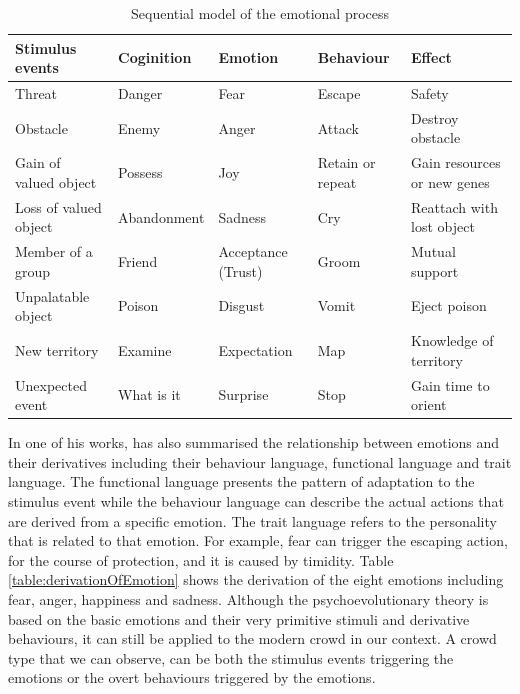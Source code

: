 \begin{table}
\caption{Sequential model of the emotional process}
\label{table:sequentialModelOfEmotion}
\centering
\begin{tabular}{|p{2.5cm}|p{2.3cm}|p{2.3cm}|p{2.3cm}|p{3.5cm}|}
\hline
\textbf{Stimulus events} & \textbf{Coginition} & \textbf{Emotion} & \textbf{Behaviour} & \textbf{Effect} \\
\hline
Threat & Danger & Fear & Escape & Safety \\
\hline
Obstacle & Enemy & Anger & Attack & Destroy obstacle \\
\hline
Gain of valued object & Possess & Joy & Retain or repeat & Gain resources or new genes \\
\hline
Loss of valued object & Abandonment & Sadness & Cry & Reattach with lost object \\
\hline
Member of a group & Friend & Acceptance (Trust) & Groom & Mutual support \\
\hline
Unpalatable object & Poison & Disgust & Vomit & Eject poison \\
\hline
New territory & Examine & Expectation & Map & Knowledge of territory \\
\hline
Unexpected event & What is it & Surprise & Stop & Gain time to orient \\
\hline
\end{tabular}
\end{table}

In one of his works, \citet{plutchik2001integration} has also summarised the relationship between emotions and their derivatives including their behaviour language, functional language and trait language. The functional language presents the pattern of adaptation to the stimulus event while the behaviour language can describe the actual actions that are derived from a specific emotion. The trait language refers to the personality that is related to that emotion. For example, fear can trigger the escaping action, for the course of protection, and it is caused by timidity. Table \ref{table:derivationOfEmotion} shows the derivation of the eight emotions including fear, anger, happiness and sadness. Although the psychoevolutionary theory is based on the basic emotions and their very primitive stimuli and derivative behaviours, it can still be applied to the modern crowd in our context. A crowd type that we can observe, can be both the stimulus events triggering the emotions or the overt behaviours triggered by the emotions. 

